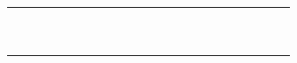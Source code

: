 \begin{landscape}
\begin{longtable}{llllllllllllllllllll}
   &    &    &       &     &     &     &     &      &      &      &      &      &       &      &      &      &      &      &       \\
   &    &    &       &     &     &     &     &      &      &      &      &      &       &      &      &      &      &      &       \\
   &    &    &       &     &     &     &     &      &      &      &      &      &       &      &      &      &      &      &       \\
   &    &    &       &     &     &     &     &      &      &      &      &      &       &      &      &      &      &      &       \\
   &    &    &       &     &     &     &     &      &      &      &      &      &       &      &      &      &      &      &       \\
   &    &    &       &     &     &     &     &      &      &      &      &      &       &      &      &      &      &      &       \\
   &    &    &       &     &     &     &     &      &      &      &      &      &       &      &      &      &      &      &       \\
   &    &    &       &     &     &     &     &      &      &      &      &      &       &      &      &      &      &      &       \\
   &    &    &       &     &     &     &     &      &      &      &      &      &       &      &      &      &      &      &      
\end{longtable}
\end{landscape}
